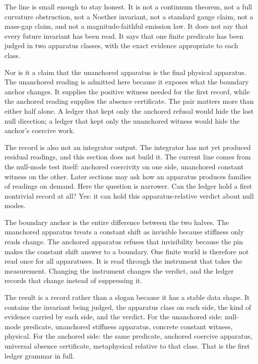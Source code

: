 The line is small enough to stay honest. It is not a continuum theorem, not a
full curvature obstruction, not a Noether invariant, not a standard gauge
claim, not a mass-gap claim, and not a magnitude-faithful emission law. It does
not say that every future invariant has been read. It says that one finite
predicate has been judged in two apparatus classes, with the exact evidence
appropriate to each class.

Nor is it a claim that the unanchored apparatus is the final physical apparatus.
The unanchored reading is admitted here because it exposes what the boundary
anchor changes. It supplies the positive witness needed for the first record,
while the anchored reading supplies the absence certificate. The pair matters
more than either half alone. A ledger that kept only the anchored refusal would
hide the lost null direction; a ledger that kept only the unanchored witness
would hide the anchor's coercive work.

The record is also not an integrator output. The integrator has not yet produced
residual readings, and this section does not build it. The current line comes
from the null-mode test itself: anchored coercivity on one side, unanchored
constant witness on the other. Later sections may ask how an apparatus produces
families of readings on demand. Here the question is narrower. Can the ledger
hold a first nontrivial record at all? Yes: it can hold this apparatus-relative
verdict about null modes.

The boundary anchor is the entire difference between the two halves. The
unanchored apparatus treats a constant shift as invisible because stiffness
only reads change. The anchored apparatus refuses that invisibility because the
pin makes the constant shift answer to a boundary. One finite world is therefore
not read once for all apparatuses. It is read through the instrument that takes
the measurement. Changing the instrument changes the verdict, and the ledger
records that change instead of suppressing it.

The result is a record rather than a slogan because it has a stable data shape.
It contains the invariant being judged, the apparatus class on each side, the
kind of evidence carried by each side, and the verdict. For the unanchored side:
null-mode predicate, unanchored stiffness apparatus, concrete constant witness,
physical. For the anchored side: the same predicate, anchored coercive
apparatus, universal absence certificate, metaphysical relative to that class.
That is the first ledger grammar in full.

